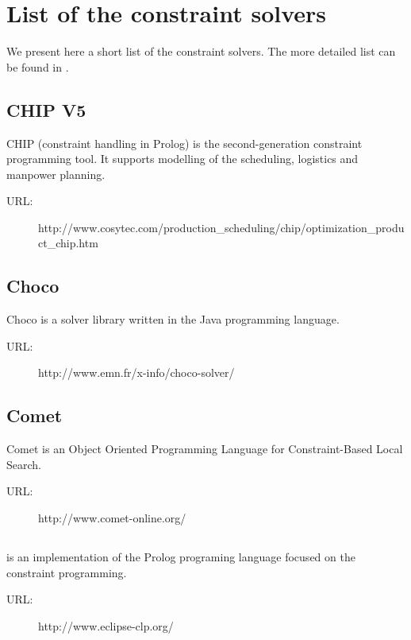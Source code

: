 \chapter{List of the constraint solvers}
\label{list-of-solvers}

We present here a short list of the constraint solvers. The more detailed list can be
found in \cite{bartak:los}.

\section*{CHIP V5}
CHIP (constraint handling in Prolog) is the second-generation constraint programming 
tool. It supports modelling of the scheduling, logistics and manpower planning. 

\begin{description}
	\item[URL:] http://www.cosytec.com/production\_scheduling/chip/optimization\_product\_chip.htm
\end{description}  

\section*{Choco}
Choco is a solver library written in the Java programming language.

\begin{description}
	\item[URL:] http://www.emn.fr/x-info/choco-solver/	
\end{description}  

\section*{Comet}
Comet is an Object Oriented Programming Language for Constraint-Based Local Search.

\begin{description}
	\item[URL:] http://www.comet-online.org/
\end{description} 

\section*{\eclipse}
\eclipse is an implementation of the Prolog programing language focused on the constraint 
programming. 

\begin{description}
	\item[URL:] http://www.eclipse-clp.org/
\end{description}  

